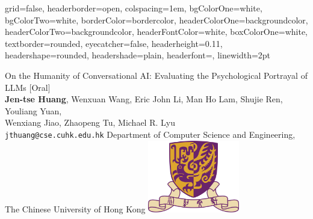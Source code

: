     \begin{poster}
    {
        grid=false,
        headerborder=open, %
        colspacing=1em, %
        bgColorOne=white, %
        bgColorTwo=white, %
        borderColor=bordercolor, %
        headerColorOne=backgroundcolor, %
        headerColorTwo=backgroundcolor, %
        headerFontColor=white, %
        boxColorOne=white, %
        textborder=rounded, %
        eyecatcher=false, %
        headerheight=0.11\textheight, %
        headershape=rounded, %
        headershade=plain,
        headerfont=\Large\textsf, %
        linewidth=2pt %
    }

%
%
    {
        \vspace{0.5em}
        \textsf{On the Humanity of Conversational AI: Evaluating the Psychological Portrayal of LLMs {\color{red}[Oral]}}
    }
    {
        \vspace{-0.1em} \\
        \textbf{Jen-tse Huang}, Wenxuan Wang, Eric John Li, Man Ho Lam, Shujie Ren, Youliang Yuan, \\
    Wenxiang Jiao, Zhaopeng Tu, Michael R. Lyu
    \vspace{0.1em} \\
    \small{\texttt{jthuang@cse.cuhk.edu.hk} \quad Department of Computer Science and Engineering, The Chinese University of Hong Kong}
    }
    {\includegraphics[width=4cm,keepaspectratio]{figures/cuhk}}



\end{poster}
